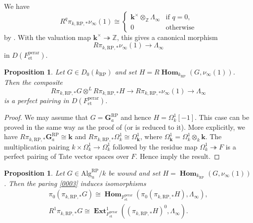 \documentclass{amsart}
\newtheorem{Prop}[Thm]{Proposition}
\theoremstyle{remark}
\numberwithin{equation}{section}
\newcommand{\onto}{\twoheadrightarrow}
\newcommand{\tensor}{\mathbin{\otimes}}
\newcommand{\Z}{\mathbb{Z}}
\newcommand{\et}{\mathrm{et}}
\newcommand{\Ga}{\mathbf{G}_{a}}
\newcommand{\perar}{\mathrm{perar}}
\newcommand{\Alg}{\mathrm{Alg}}
\newcommand{\alg}[1]{\mathbf{#1}}
\newcommand{\RP}{\mathrm{RP}}
\DeclareMathOperator{\sheafhom}{\alg{Hom}}
\DeclareMathOperator{\sheafext}{\alg{Ext}}
\begin{document}
We have
	\[
			R^{q} \pi_{k, \RP, \ast} \nu_{\infty}(1)
		\cong
			\begin{cases}
					\alg{k}^{\times} \tensor_{\Z} \Lambda_{\infty}
				&	\text{if }
					q = 0,
				\\
					0
				&	\text{otherwise}
			\end{cases}
	\]
by \cite[Proposition 6.1.6]{Suz24}.
With the valuation map $\alg{k}^{\times} \onto \Z$,
this gives a canonical morphism
	\[
			R \pi_{k, \RP, \ast} \nu_{\infty}(1)
		\to
			\Lambda_{\infty}
	\]
in $D(F^{\perar}_{\et})$.

\begin{Prop} \label{0099}
	Let $G \in D_{0}(k_{\RP})$ and set $H = R \sheafhom_{k_{\RP}}(G, \nu_{\infty}(1))$.
	Then the composite
		\begin{equation} \label{0003}
					R \pi_{k, \RP, \ast} G
				\tensor^{L}
					R \pi_{k, \RP, \ast} H
			\to
				R \pi_{k, \RP, \ast} \nu_{\infty}(1)
			\to
				\Lambda_{\infty}
		\end{equation}
	is a perfect pairing in $D(F^{\perar}_{\et})$.
\end{Prop}

\begin{proof}
	We may assume that $G = \Ga^{\RP}$ and hence $H = \Omega_{k}^{1}[-1]$.
	This case can be proved in the same way as the proof of \cite[Proposition (5.2.2.4)]{Suz20}
	(or is reduced to it).
	More explicitly, we have $R \pi_{k, \RP, \ast} \Ga^{\RP} \cong \alg{k}$
	and $R \pi_{k, \RP, \ast} \Omega_{k}^{1} \cong \Omega_{\alg{k}}^{1}$,
	where $\Omega_{\alg{k}}^{1} = \Omega_{k}^{1} \tensor_{k} \alg{k}$.
	The multiplication pairing $k \times \Omega_{k}^{1} \to \Omega_{k}^{1}$
	followed by the residue map $\Omega_{k}^{1} \onto F$ is a perfect pairing of Tate vector spaces over $F$.
	Hence \cite[Propositions 3.4.5 and 3.4.4]{Suz24} imply the result.
\end{proof}

\begin{Prop} \label{0006}
	Let $G \in \Alg^{\RP}_{u} / k$ be wound
	and set $H = \sheafhom_{k_{\RP}}(G, \nu_{\infty}(1))$.
	Then the paring \eqref{0003} induces isomorphisms
		\begin{gather*}
					\pi_{0}(\pi_{k, \RP, \ast} G)
				\cong
					\sheafhom_{F^{\perar}_{\et}}(
						\pi_{0}(\pi_{k, \RP, \ast} H),
						\Lambda_{\infty}
					),
			\\
					R^{1} \pi_{k, \RP, \ast} G
				\cong
					\sheafext_{F^{\perar}_{\et}}^{1}(
						(\pi_{k, \RP, \ast} H)^{0},
						\Lambda_{\infty}
					).
		\end{gather*}
\end{Prop}
\end{document}
